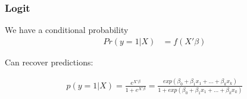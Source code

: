 \documentclass[
  shownotes,
  xcolor={svgnames},
  hyperref={colorlinks,citecolor=DarkBlue,linkcolor=DarkRed,urlcolor=DarkBlue}
  , aspectratio=169]{beamer}
\begin{document}
\begin{frame}[fragile]
\frametitle{Logit}
We have a conditional probability
\begin{align}
Pr(y=1|X) &= f(X'\beta) 
\end{align}

Can recover predictions:

\begin{align}
p(y=1|X)=\frac{e^{X'\beta}}{1+e^{X'\beta}}=\frac{exp(\beta_0 +\beta_1 x_1 + \dots +\beta_k x_k)}{1+exp(\beta_0 +\beta_1 x_1 + \dots +\beta_k x_k)}
\end{align}

\end{frame}

\end{document}
